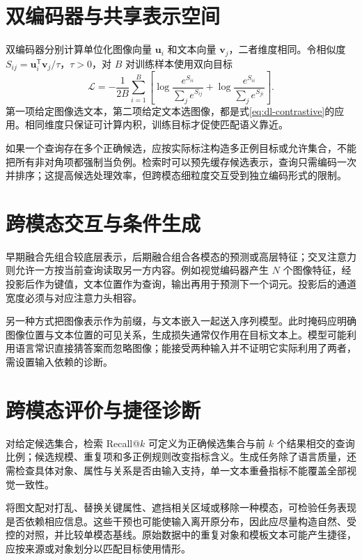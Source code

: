 \documentclass[UTF8,12pt,a4paper,fontset=fandol]{ctexbook}
\begin{document}
\section{双编码器与共享表示空间}
双编码器分别计算单位化图像向量 $\mathbf u_i$ 和文本向量 $\mathbf v_j$，二者维度相同。令相似度 $S_{ij}=\mathbf u_i^\mathsf T\mathbf v_j/\tau$，$\tau>0$，对 $B$ 对训练样本使用双向目标
\begin{equation}
\mathcal L=-\frac1{2B}\sum_{i=1}^B\left[\log\frac{e^{S_{ii}}}{\sum_je^{S_{ij}}}+\log\frac{e^{S_{ii}}}{\sum_je^{S_{ji}}}\right].
\label{eq:dl-multimodal-contrast}
\end{equation}
第一项给定图像选文本，第二项给定文本选图像，都是式\eqref{eq:dl-contrastive}的应用。相同维度只保证可计算内积，训练目标才促使匹配语义靠近。

如果一个查询存在多个正确候选，应按实际标注构造多正例目标或允许集合，不能把所有非对角项都强制当负例。检索时可以预先缓存候选表示，查询只需编码一次并排序；这提高候选处理效率，但跨模态细粒度交互受到独立编码形式的限制。

\section{跨模态交互与条件生成}
早期融合先组合较底层表示，后期融合组合各模态的预测或高层特征；交叉注意力则允许一方按当前查询读取另一方内容。例如视觉编码器产生 $N$ 个图像特征，经投影后作为键值，文本位置作为查询，输出再用于预测下一个词元。投影后的通道宽度必须与对应注意力头相容。

另一种方式把图像表示作为前缀，与文本嵌入一起送入序列模型。此时掩码应明确图像位置与文本位置的可见关系，生成损失通常仅作用在目标文本上。模型可能利用语言常识直接猜答案而忽略图像；能接受两种输入并不证明它实际利用了两者，需设置输入依赖的诊断。

\section{跨模态评价与捷径诊断}
对给定候选集合，检索 Recall@$k$ 可定义为正确候选集合与前 $k$ 个结果相交的查询比例；候选规模、重复项和多正例规则改变指标含义。生成任务除了语言质量，还需检查具体对象、属性与关系是否由输入支持，单一文本重叠指标不能覆盖全部视觉一致性。

将图文配对打乱、替换关键属性、遮挡相关区域或移除一种模态，可检验任务表现是否依赖相应信息。这些干预也可能使输入离开原分布，因此应尽量构造自然、受控的对照，并比较单模态基线。原始数据中的重复对象和模板文本可能产生捷径，应按来源或对象划分以匹配目标使用情形。
\end{document}
